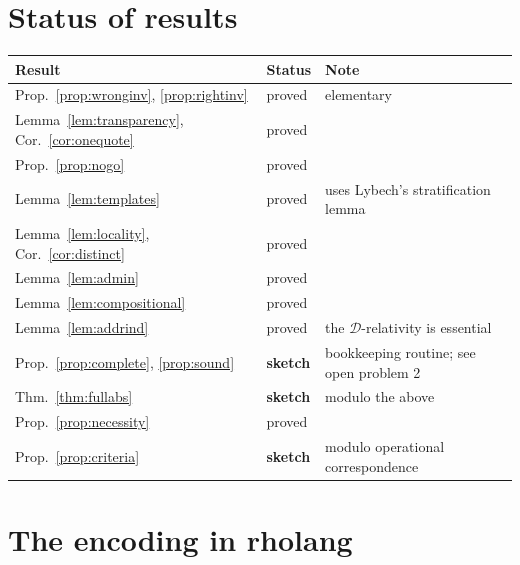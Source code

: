 \documentclass[11pt]{article}
\theoremstyle{definition}
\theoremstyle{plain}
\theoremstyle{remark}
\newcommand{\Obs}{\mathcal{D}}
\begin{document}
\appendix

\section{Status of results}

\begin{center}
\begin{tabular}{@{}llp{}@{}}
\toprule
Result & Status & Note \\
\midrule
Prop.~\ref{prop:wronginv}, \ref{prop:rightinv} & proved & elementary \\
Lemma~\ref{lem:transparency}, Cor.~\ref{cor:onequote} & proved & \\
Prop.~\ref{prop:nogo} & proved & \\
Lemma~\ref{lem:templates} & proved & uses Lybech's stratification lemma \\
Lemma~\ref{lem:locality}, Cor.~\ref{cor:distinct} & proved & \\
Lemma~\ref{lem:admin} & proved & \\
Lemma~\ref{lem:compositional} & proved & \\
Lemma~\ref{lem:addrind} & proved & the $\Obs$-relativity is essential \\
Prop.~\ref{prop:complete}, \ref{prop:sound} & \textbf{sketch} & bookkeeping routine; see open problem 2 \\
Thm.~\ref{thm:fullabs} & \textbf{sketch} & modulo the above \\
Prop.~\ref{prop:necessity} & proved & \\
Prop.~\ref{prop:criteria} & \textbf{sketch} & modulo operational correspondence \\
\bottomrule
\end{tabular}
\end{center}

\section{The encoding in rholang}
\end{document}
